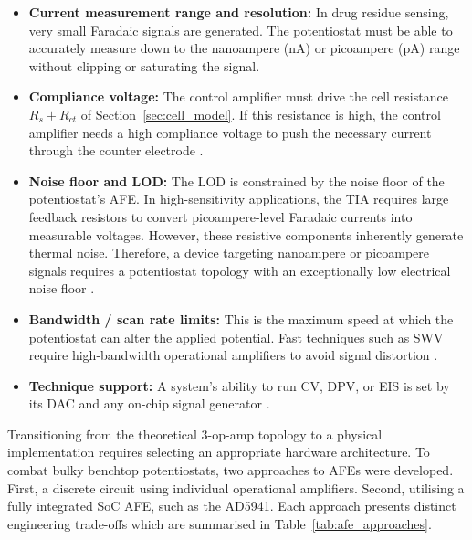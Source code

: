 \begin{itemize}[label=\textbullet]
    \item \textbf{Current measurement range and resolution:} In drug residue sensing, very small Faradaic signals are generated. The potentiostat must be able to accurately measure down to the nanoampere (nA) or picoampere (pA) range without clipping or saturating the signal.

    \item \textbf{Compliance voltage:} The control amplifier must drive the cell resistance $R_s + R_{ct}$ of Section~\ref{sec:cell_model}. If this resistance is high, the control amplifier needs a high compliance voltage to push the necessary current through the counter electrode \cite{pineresearch_compliance}.

    \item \textbf{Noise floor and \ac{LOD}:} The LOD is constrained by the noise floor of the potentiostat's AFE. In high-sensitivity applications, the TIA requires large feedback resistors to convert picoampere-level Faradaic currents into measurable voltages. However, these resistive components inherently generate thermal noise. Therefore, a device targeting nanoampere or picoampere signals requires a potentiostat topology with an exceptionally low electrical noise floor \cite{graeme1996photodiode,adi_mt059}.

    \item \textbf{Bandwidth / scan rate limits:} This is the maximum speed at which the potentiostat can alter the applied potential. Fast techniques such as \ac{SWV} require high-bandwidth operational amplifiers to avoid signal distortion \cite{bard2001}.

    \item \textbf{Technique support:} A system's ability to run CV, DPV, or \ac{EIS} is set by its \ac{DAC} and any on-chip signal generator \cite{hunstat2024,hunstat2_2025}.
\end{itemize}

\label{sec:afe_approaches}

Transitioning from the theoretical 3-op-amp topology to a physical implementation requires selecting an appropriate hardware architecture. To combat bulky benchtop potentiostats, two approaches to AFEs were developed. First, a discrete circuit using individual operational amplifiers. Second, utilising a fully integrated \ac{SoC} AFE, such as the AD5941. Each approach presents distinct engineering trade-offs which are summarised in Table~\ref{tab:afe_approaches}.

